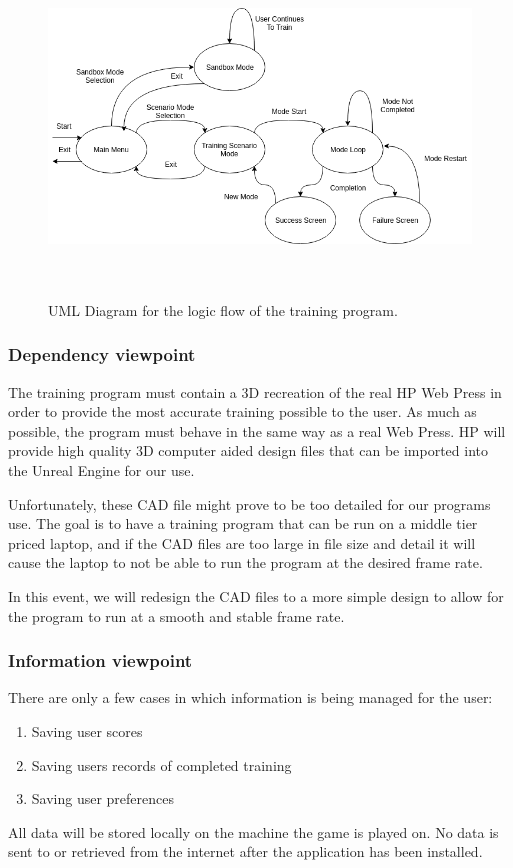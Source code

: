 \documentclass[onecolumn, draftclsnofoot,10pt, compsoc]{IEEEtran}
\begin{document}
\begin{center}
    \begin{figure}[h]
        \centering
        \includegraphics[width=15cm, height=9cm]{logical_view1.png}
        \caption{UML Diagram for the logic flow of the training program.}
        \label{fig:logic_uml}
    \end{figure}
\end{center}

\subsubsection{Dependency viewpoint}
The training program must contain a 3D recreation of the real HP Web Press in order to provide the most accurate training possible to the user. As much as possible, the program must behave in the same way as a real Web Press. HP will provide high quality 3D computer aided design files that can be imported into the Unreal Engine for our use.

Unfortunately, these CAD file might prove to be too detailed for our programs use. The goal is to have a training program that can be run on a middle tier priced laptop, and if the CAD files are too large in file size and detail it will cause the laptop to not be able to run the program at the desired frame rate.

In this event, we will redesign the CAD files to a more simple design to allow for the program to run at a smooth and stable frame rate.
\subsubsection{Information viewpoint}
There are only a few cases in which information is being managed for the user:
\begin{enumerate}
    \item Saving user scores
    \item Saving users records of completed training
    \item Saving user preferences
\end{enumerate}
All data will be stored locally on the machine the game is played on. No data is sent to or retrieved from the internet after the application has been installed. 
\end{document}
